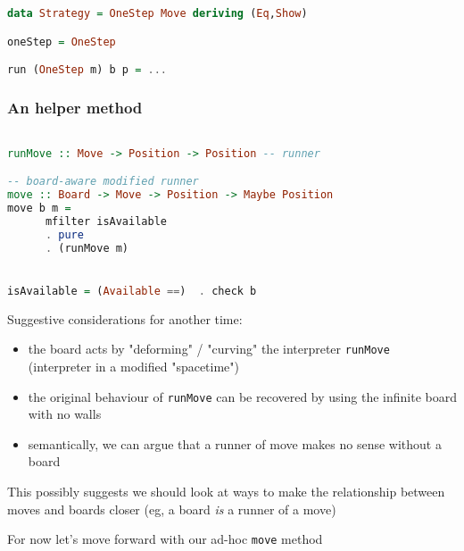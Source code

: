\documentclass[10pt]{beamer}
\begin{document}
\begin{frame}[fragile]
\begin{lstlisting}[language=haskell, basicstyle=\ttfamily]
data Strategy = OneStep Move deriving (Eq,Show)

oneStep = OneStep

run (OneStep m) b p = ...
\end{lstlisting}
\end{frame}
\begin{frame}[fragile]
  \frametitle{An helper method}
\begin{lstlisting}[language=haskell, basicstyle=\ttfamily]

runMove :: Move -> Position -> Position -- runner 

-- board-aware modified runner 
move :: Board -> Move -> Position -> Maybe Position
move b m =
      mfilter isAvailable
      . pure 
      . (runMove m)


isAvailable = (Available ==)  . check b

\end{lstlisting}
\end{frame}

\begin{frame}[fragile]

Suggestive considerations for another time:
  \begin{itemize}
    \item the board acts by "deforming" / "curving" the interpreter \texttt{runMove} (interpreter in a modified "spacetime")
    \item the original behaviour of \texttt{runMove} can be recovered by using the infinite board with no walls
    \item semantically, we can argue that a runner of move makes no sense without a board 
  \end{itemize}

This possibly suggests we should look at ways to make the relationship between moves and boards closer (eg, a board \emph{is} a runner of a move)

For now let's move forward with our ad-hoc \texttt{move} method

\end{frame}
\end{document}
